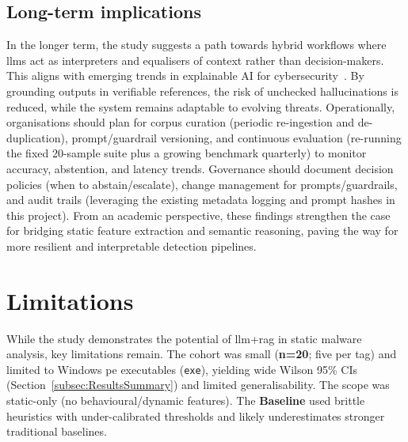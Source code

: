 \subsection{Long-term implications}\label{subsec:LongTermImplications}
In the longer term, the study suggests a path towards hybrid workflows where \glspl{llm} act as
interpreters and equalisers of context rather than decision-makers. This aligns with emerging
trends in explainable AI for cybersecurity~\cite{fujii2024llm, nourmohammadzadeh2024llmsurvey}. By
grounding outputs in verifiable references, the risk of unchecked hallucinations is reduced, while
the system remains adaptable to evolving threats. Operationally, organisations should plan for
corpus curation (periodic re-ingestion and de-duplication), prompt/guardrail versioning, and
continuous evaluation (re-running the fixed 20-sample suite plus a growing benchmark quarterly) to
monitor accuracy, abstention, and latency trends. Governance should document decision policies
(when to abstain/escalate), change management for prompts/guardrails, and audit trails (leveraging
the existing metadata logging and prompt hashes in this project). From an academic perspective,
these findings strengthen the case for bridging static feature extraction and semantic reasoning,
paving the way for more resilient and interpretable detection pipelines.

\section{Limitations}\label{sec:Limitations}
While the study demonstrates the potential of \gls{llm}+\gls{rag} in static malware analysis, key
limitations remain. The cohort was small (\textbf{n=20}; five per tag) and limited to Windows
\gls{pe} executables (\texttt{exe}), yielding wide Wilson 95\% CIs
(Section~\ref{subsec:ResultsSummary}) and limited generalisability. The scope was static-only (no
behavioural/dynamic features). The \textbf{Baseline} used brittle heuristics with under-calibrated
thresholds and likely underestimates stronger traditional baselines.

